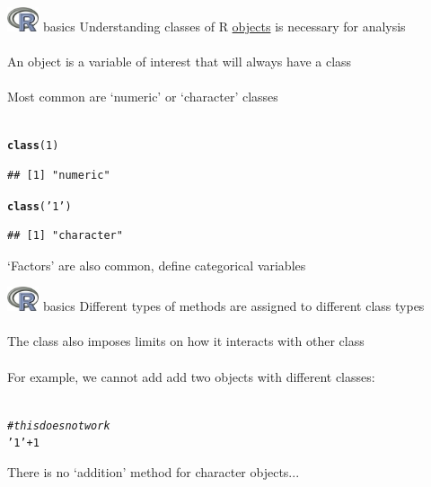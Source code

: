 \documentclass[xcolor=svgnames]{beamer}\usepackage[]{graphicx}\usepackage[]{color}
\makeatletter
\newcommand{\hlnum}[1]{\textcolor[rgb]{0.686,0.059,0.569}{#1}}%
\newcommand{\hlstr}[1]{\textcolor[rgb]{0.192,0.494,0.8}{#1}}%
\newcommand{\hlcom}[1]{\textcolor[rgb]{0.678,0.584,0.686}{\textit{#1}}}%
\newcommand{\hlopt}[1]{\textcolor[rgb]{0,0,0}{#1}}%
\newcommand{\hlstd}[1]{\textcolor[rgb]{0.345,0.345,0.345}{#1}}%
\newcommand{\hlkwd}[1]{\textcolor[rgb]{0.737,0.353,0.396}{\textbf{#1}}}%
\newenvironment{kframe}{%
 \def\at@end@of@kframe{}%
 \ifinner\ifhmode%
  \def\at@end@of@kframe{\end{minipage}}%
  \begin{minipage}{\columnwidth}%
 \fi\fi%
 \def\FrameCommand##1{\hskip\@totalleftmargin \hskip-\fboxsep
 \colorbox{shadecolor}{##1}\hskip-\fboxsep
     \hskip-\linewidth \hskip-\@totalleftmargin \hskip\columnwidth}%
 \MakeFramed {\advance\hsize-\width
   \@totalleftmargin\z@ \linewidth\hsize
   \@setminipage}}%
 {\par\unskip\endMakeFramed%
 \at@end@of@kframe}
\newenvironment{knitrout}{}{} %
\makeatother
\begin{document}
\begin{frame}[fragile,t]{\includegraphics[width=0.07\textwidth]{Rlogo.jpg} \hspace{0.01in} basics}
Understanding classes of R \href{http://cran.r-project.org/doc/manuals/r-release/R-lang.html#Vector-objects}{objects} is necessary for analysis \\~\\
An object is a variable of interest that will always have a class\\~\\
Most common are `numeric' or `character' classes \\~\\
\begin{knitrout}
\color{fgcolor}\begin{kframe}
\begin{alltt}
\hlkwd{class}\hlstd{(}\hlnum{1}\hlstd{)}
\end{alltt}
\begin{verbatim}
## [1] "numeric"
\end{verbatim}
\begin{alltt}
\hlkwd{class}\hlstd{(}\hlstr{'1'}\hlstd{)}
\end{alltt}
\begin{verbatim}
## [1] "character"
\end{verbatim}
\end{kframe}
\end{knitrout}
`Factors' are also common, define categorical variables
\end{frame}

\begin{frame}[fragile,t]{\includegraphics[width=0.07\textwidth]{Rlogo.jpg} \hspace{0.01in} basics}
Different types of methods are assigned to different class types\\~\\
The class also imposes limits on how it interacts with other class \\~\\
For example, we cannot add add two objects with different classes:\\~\\
\begin{knitrout}
\color{fgcolor}\begin{kframe}
\begin{alltt}
\hlcom{# this does not work}
\hlstr{'1'} \hlopt{+} \hlnum{1}
\end{alltt}


{\ttfamily\noindent\bfseries\color{errorcolor}{\#\# Error: non-numeric argument to binary operator}}\end{kframe}
\end{knitrout}
There is no `addition' method for character objects...
\end{frame}
\end{document}

